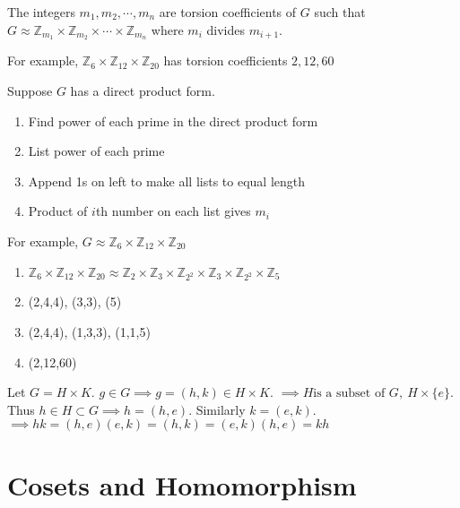 \begin{definition}
	The integers $m_1,m_2,\cdots,m_n$ are torsion coefficients of $G$ such that $G \approx \mathbb{Z}_{m_1} \times \mathbb{Z}_{m_2} \times \cdots \times \mathbb{Z}_{m_n}$ where $m_i$ divides $m_{i+1}$.%
\end{definition}

For example, $\mathbb{Z}_6 \times \mathbb{Z}_{12} \times \mathbb{Z}_{20}$ has torsion coefficients $2, 12, 60$

\begin{remark} Suppose $G$ has a direct product form.%
	\begin{enumerate}[label=Step \arabic*]
		\item Find power of each prime in the direct product form
		\item List power of each prime
		\item Append 1s on left to make all lists to equal length
		\item Product of $i$th number on each list gives $m_i$
	\end{enumerate}
\end{remark}

For example, $G \approx \mathbb{Z}_6 \times \mathbb{Z}_{12} \times \mathbb{Z}_{20}$
\begin{enumerate}[label=Step \arabic*]
	\item $\mathbb{Z}_6 \times \mathbb{Z}_{12} \times \mathbb{Z}_{20} \approx \mathbb{Z}_2 \times \mathbb{Z}_3 \times \mathbb{Z}_{2^2} \times \mathbb{Z}_3 \times \mathbb{Z}_{2^2} \times \mathbb{Z}_5$
	\item (2,4,4), (3,3), (5)
	\item (2,4,4), (1,3,3), (1,1,5)
	\item (2,12,60)
\end{enumerate}

\begin{remark}
	Let $G = H \times K$.
	$g \in G \implies g = (h,k) \in H \times K$.%
	$\implies H \text{is a subset of } G,\ H \times \{e\}$.
	Thus $h \in H \subset G \implies h = (h,e)$.
	Similarly $k = (e,k)$.
	$\implies hk = (h,e)(e,k) = (h,k) = (e,k)(h,e) = kh$
\end{remark}

\section{Cosets and Homomorphism}

